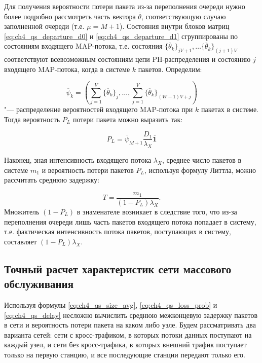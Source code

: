 Для получения вероятности потери пакета из-за переполнения очереди нужно более подробно рассмотреть часть вектора $\overline{\theta}$, соответствующую случаю заполненной очереди (т.е. $\mu=M+1$). Состояния внутри блоков матриц \eqref{eq:ch4_qs_departure_d0} и \eqref{eq:ch4_qs_departure_d1} сгруппированы по состояниям входящего MAP-потока, т.е. состояния $\{ \overline{\theta}_k \}_{jV + 1}, \dots \{ \overline{\theta}_k \}_{(j+1)V}$ соответствуют всевозможным состояниям цепи PH-распределения и состоянию $j$ входящего MAP-потока, когда в системе $k$ пакетов. Определим:

\begin{equation}
    \label{eq:ch4_qs_size_slice_pmf}
    \overline{\psi}_k = ( \sum\limits_{j=1}^{V}\{ \overline{\theta}_k \}_j, \dots, \sum\limits_{j=1}^{V}\{ \overline{\theta}_{k} \}_{(W-1)V + j} )
\end{equation}
"--- распределение вероятностей входящего MAP-потока при $k$ пакетах в системе. Тогда вероятность $P_L$ потери пакета можно выразить так:

\begin{equation}
  \label{eq:ch4_qs_loss_prob}
  P_L = \overline{\psi}_{M+1} \frac{D_1}{\lambda_X}\overline{\mathbf{1}}
\end{equation}

Наконец, зная интенсивность входящего потока $\lambda_{X}$, среднее число пакетов в системе $m_1$ и вероятность потери пакетов $P_L$, используя формулу Литтла, можно рассчитать среднюю задержку:

\begin{equation}
	\label{eq:ch4_qs_delay}
	T = \frac{m_1}{(1 - P_L)\lambda_{X}}.
\end{equation}
Множитель $(1 - P_L)$ в знаменателе возникает в следствие того, что из-за переполнения очереди лишь часть пакетов входящего потока попадает в систему, т.е. фактическая интенсивность потока пакетов, поступающих в систему, составляет $(1 - P_L) \lambda_{X}$.



\subsection{Точный расчет характеристик сети массового обслуживания}\label{sec:ch4_queue_net_precise}


Используя формулы \eqref{eq:ch4_qs_size_avg}, \eqref{eq:ch4_qs_loss_prob} и \eqref{eq:ch4_qs_delay} несложно вычислить среднюю межконцевую задержку пакетов в сети и вероятность потери пакета на каком либо узле. Будем рассматривать два варианта сетей: сети с кросс-трафиком, в которых потоки данных поступают на каждый узел, и сети без кросс-трафика, в которых внешний трафик поступает только на первую станцию, и все последующие станции передают только его.

